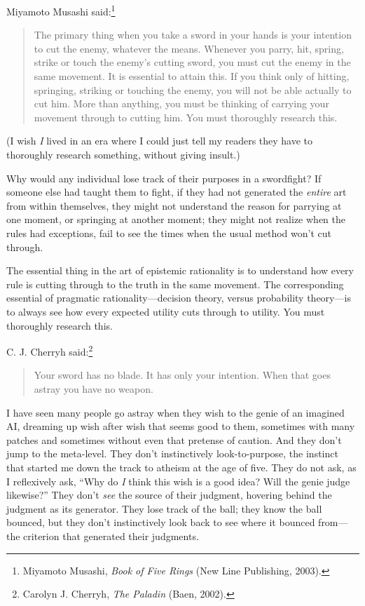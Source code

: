 {{
 Miyamoto Musashi said:\footnote{Miyamoto Musashi, \textit{Book of Five Rings} (New Line
Publishing, 2003).}}

\begin{quote}
{
 The primary thing when you take a sword in your hands is your
intention to cut the enemy, whatever the means. Whenever you parry,
hit, spring, strike or touch the enemy's cutting sword,
you must cut the enemy in the same movement. It is essential to attain
this. If you think only of hitting, springing, striking or touching the
enemy, you will not be able actually to cut him. More than anything,
you must be thinking of carrying your movement through to cutting him.
You must thoroughly research this.}
\end{quote}


 (I wish \textit{I} lived in an era where I could just tell my
readers they have to thoroughly research something, without giving
insult.)


 Why would any individual lose track of their purposes in a
swordfight? If someone else had taught them to fight, if they had not
generated the \textit{entire} art from within themselves, they might
not understand the reason for parrying at one moment, or springing at
another moment; they might not realize when the rules had exceptions,
fail to see the times when the usual method won't cut
through.


 The essential thing in the art of epistemic rationality is to
understand how every rule is cutting through to the truth in the same
movement. The corresponding essential of pragmatic
rationality---decision theory, versus probability theory---is to always
see how every expected utility cuts through to utility. You must
thoroughly research this.


 C. J. Cherryh said:\footnote{Carolyn J. Cherryh, \textit{The Paladin} (Baen, 2002).}

\begin{quote}
{
 Your sword has no blade. It has only your intention. When that
 goes astray you have no weapon.}
\end{quote}


 I have seen many people go astray when they wish to the genie of
an imagined AI, dreaming up wish after wish that seems good to them,
sometimes with many patches and sometimes without even that pretense of
caution. And they don't jump to the meta-level. They
don't instinctively look-to-purpose, the instinct that
started me down the track to atheism at the age of five. They do not
ask, as I reflexively ask, ``Why do \textit{I} think
this wish is a good idea? Will the genie judge
likewise?'' They don't \textit{see}
the source of their judgment, hovering behind the judgment as its
generator. They lose track of the ball; they know the ball bounced, but
they don't instinctively look back to see where it
bounced from---the criterion that generated their judgments.


}
